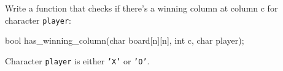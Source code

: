 \begin{ex}
Write a function that checks if there's a winning column at column c for character \texttt{player}:

\begin{consolethree}
bool has_winning_column(char board[n][n], int c, char player); 
\end{consolethree}

Character \texttt{player} is either \texttt{'X'} or \texttt{'O'}.
\end{ex}
